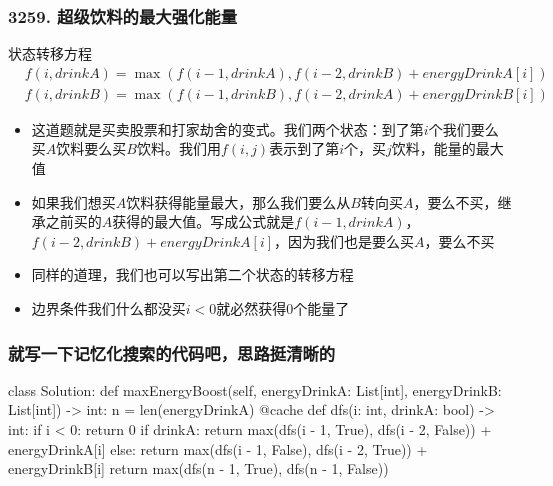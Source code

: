 \begin{frame}[fragile]          %
  \frametitle{\textsc{3259. 超级饮料的最大强化能量}}
    \begin{alertblock}{状态转移方程}
    \begin{align}
      &f(i,drinkA)=\max(f(i-1,drinkA),f(i-2,drinkB)+energyDrinkA[i])\\
      &f(i,drinkB)=\max(f(i-1,drinkB),f(i-2,drinkA)+energyDrinkB[i])
    \end{align}
  \end{alertblock}
  \begin{itemize}
    \item 这道题就是买卖股票和打家劫舍的变式。我们两个状态：到了第$i$个我们要么买$A$饮料要么买$B$饮料。我们用$f(i,j)$表示到了第$i$个，买$j$饮料，能量的最大值
    \item 如果我们想买$A$饮料获得能量最大，那么我们要么从$B$转向买$A$，要么不买，继承之前买的$A$获得的最大值。写成公式就是$f(i-1,drinkA)$，$f(i-2,drinkB)+energyDrinkA[i]$，因为我们也是要么买$A$，要么不买
    \item 同样的道理，我们也可以写出第二个状态的转移方程
    \item 边界条件我们什么都没买$i < 0$就必然获得$0$个能量了
  \end{itemize}
\end{frame}

\begin{frame}[fragile]
  \frametitle{就写一下记忆化搜索的代码吧，思路挺清晰的}
  \begin{codeblock}[language=python]{}
class Solution:
    def maxEnergyBoost(self, energyDrinkA: List[int], energyDrinkB: List[int]) -> int:
        n = len(energyDrinkA)
        @cache
        def dfs(i: int, drinkA: bool) -> int:
            if i < 0:
                return 0
            if drinkA:
                return max(dfs(i - 1, True), dfs(i - 2, False)) + energyDrinkA[i]
            else:
                return max(dfs(i - 1, False), dfs(i - 2, True)) + energyDrinkB[i]
        return max(dfs(n - 1, True), dfs(n - 1, False))
  \end{codeblock}
\end{frame}

